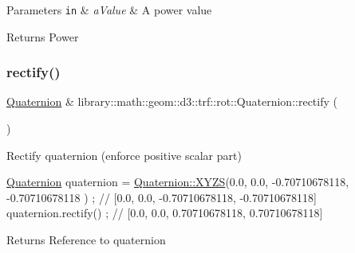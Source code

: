 \begin{DoxyParams}[1]{Parameters}
\mbox{\tt in}  & {\em a\+Value} & A power value \\
\hline
\end{DoxyParams}
\begin{DoxyReturn}{Returns}
Power 
\end{DoxyReturn}
\mbox{\label{classlibrary_1_1math_1_1geom_1_1d3_1_1trf_1_1rot_1_1_quaternion_aad5bf4f7ab207b0c001680773d81071e}} 
\subsubsection{\texorpdfstring{rectify()}{rectify()}}
{\footnotesize\ttfamily \hyperlink{classlibrary_1_1math_1_1geom_1_1d3_1_1trf_1_1rot_1_1_quaternion}{Quaternion} \& library\+::math\+::geom\+::d3\+::trf\+::rot\+::\+Quaternion\+::rectify (\begin{DoxyParamCaption}{ }\end{DoxyParamCaption})}



Rectify quaternion (enforce positive scalar part) 


\begin{DoxyCode}
\hyperlink{classlibrary_1_1math_1_1geom_1_1d3_1_1trf_1_1rot_1_1_quaternion_a1b8794cce68c5ee86dd50f9ba53635fa}{Quaternion} quaternion = \hyperlink{classlibrary_1_1math_1_1geom_1_1d3_1_1trf_1_1rot_1_1_quaternion_a006294eb483bcfc352c2dc36cf19ceec}{Quaternion::XYZS}(0.0, 0.0, -0.70710678118, -0.70710678118
      ) ; \textcolor{comment}{// [0.0, 0.0, -0.70710678118, -0.70710678118]}
quaternion.rectify() ; \textcolor{comment}{// [0.0, 0.0, 0.70710678118, 0.70710678118]}
\end{DoxyCode}


\begin{DoxyReturn}{Returns}
Reference to quaternion 
\end{DoxyReturn}
\mbox{\label{classlibrary_1_1math_1_1geom_1_1d3_1_1trf_1_1rot_1_1_quaternion_ac153a30d250d35c719e4678a5890a11f}} 
